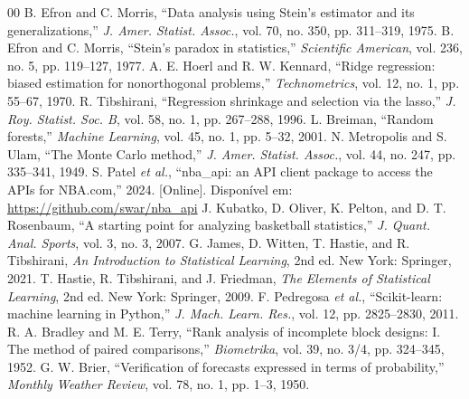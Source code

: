 \documentclass[conference]{IEEEtran}
\begin{document}
\begin{thebibliography}{00}
 B. Efron and C. Morris, ``Data analysis using Stein's estimator and its generalizations,'' \textit{J. Amer. Statist. Assoc.}, vol. 70, no. 350, pp. 311--319, 1975.
 B. Efron and C. Morris, ``Stein's paradox in statistics,'' \textit{Scientific American}, vol. 236, no. 5, pp. 119--127, 1977.
 A. E. Hoerl and R. W. Kennard, ``Ridge regression: biased estimation for nonorthogonal problems,'' \textit{Technometrics}, vol. 12, no. 1, pp. 55--67, 1970.
 R. Tibshirani, ``Regression shrinkage and selection via the lasso,'' \textit{J. Roy. Statist. Soc. B}, vol. 58, no. 1, pp. 267--288, 1996.
 L. Breiman, ``Random forests,'' \textit{Machine Learning}, vol. 45, no. 1, pp. 5--32, 2001.
 N. Metropolis and S. Ulam, ``The Monte Carlo method,'' \textit{J. Amer. Statist. Assoc.}, vol. 44, no. 247, pp. 335--341, 1949.
 S. Patel \textit{et al.}, ``nba\_api: an API client package to access the APIs for NBA.com,'' 2024. [Online]. Disponível em: \url{https://github.com/swar/nba_api}
 J. Kubatko, D. Oliver, K. Pelton, and D. T. Rosenbaum, ``A starting point for analyzing basketball statistics,'' \textit{J. Quant. Anal. Sports}, vol. 3, no. 3, 2007.
 G. James, D. Witten, T. Hastie, and R. Tibshirani, \textit{An Introduction to Statistical Learning}, 2nd ed. New York: Springer, 2021.
 T. Hastie, R. Tibshirani, and J. Friedman, \textit{The Elements of Statistical Learning}, 2nd ed. New York: Springer, 2009.
 F. Pedregosa \textit{et al.}, ``Scikit-learn: machine learning in Python,'' \textit{J. Mach. Learn. Res.}, vol. 12, pp. 2825--2830, 2011.
 R. A. Bradley and M. E. Terry, ``Rank analysis of incomplete block designs: I. The method of paired comparisons,'' \textit{Biometrika}, vol. 39, no. 3/4, pp. 324--345, 1952.
 G. W. Brier, ``Verification of forecasts expressed in terms of probability,'' \textit{Monthly Weather Review}, vol. 78, no. 1, pp. 1--3, 1950.
\end{thebibliography}
\end{document}
